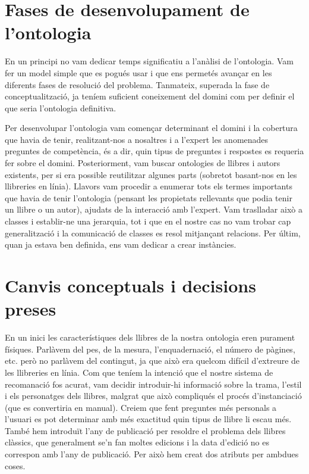 
\section{Fases de desenvolupament de l'ontologia}

En un principi no vam dedicar temps significatiu a l'anàlisi de l'ontologia. Vam fer un model simple que es pogués usar i que ens permetés avançar en les diferents fases de resolució del problema. Tanmateix, superada la fase de conceptualització, ja teníem suficient coneixement del domini com per definir el que seria l'ontologia definitiva.

Per desenvolupar l'ontologia vam començar determinant el domini i la cobertura que havia de tenir, realitzant-nos a nosaltres i a l'expert les anomenades preguntes de competència, és a dir, quin tipus de preguntes i respostes es requeria fer sobre el domini. Posteriorment, vam buscar ontologies de llibres i autors existents, per si era possible reutilitzar algunes parts (sobretot basant-nos en les llibreries en línia). Llavors vam procedir a enumerar tots els termes importants que havia de tenir l'ontologia (pensant les propietats rellevants que podia tenir un llibre o un autor), ajudats de la interacció amb l'expert. Vam traslladar això a classes i establir-ne una jerarquia, tot i que en el nostre cas no vam trobar cap generalització i la comunicació de classes es resol mitjançant relacions. Per últim, quan ja estava ben definida, ens vam dedicar a crear instàncies.

\section{Canvis conceptuals i decisions preses}

En un inici les característiques dels llibres de la nostra ontologia eren purament físiques. Parlàvem del pes, de la mesura, l'enquadernació, el número de pàgines, etc. però no parlàvem del contingut, ja que això era quelcom difícil d'extreure de les llibreries en línia. Com que teníem la intenció que el nostre sistema de recomanació fos acurat, vam decidir introduir-hi informació sobre la trama, l'estil i els personatges dels llibres, malgrat que això compliqués el procés d'instanciació (que es convertiria en manual). Creiem que fent preguntes més personals a l'usuari es pot determinar amb més exactitud quin tipus de llibre li escau més. També hem introduït l'any de publicació per resoldre el problema dels llibres clàssics, que generalment se'n fan moltes edicions i la data d'edició no es correspon amb l'any de publicació. Per això hem creat dos atributs per ambdues coses.

